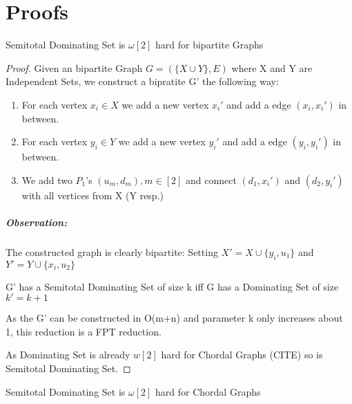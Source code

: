 \chapter{Proofs}

\begin{theorem}
    Semitotal Dominating Set is $\omega[2]$ hard for bipartite Graphs
\end{theorem}

\begin{proof}
    Given an bipartite Graph $G = ( \{X \cup Y\}, E)$ where X and Y are Independent Sets, we construct a bipratite G' the following way:
    \begin{enumerate}
        \item For each vertex $x_i \in X$ we add a new vertex $x_i'$  and add a edge $(x_i, x_i')$ in between.
        \item For each vertex $y_i \in Y$ we add a new vertex $y_i'$ and add a edge $(y_i, y_i')$ in between.
        \item We add two $P_1$'s $(u_m, d_m), m \in [2]$ and connect $(d_1, x_i')$ and $(d_2, y_i')$ with all vertices from X (Y resp.) 
    \end{enumerate}
    \paragraph*{Observation:} The constructed graph is clearly bipartite: Setting $X' = X \cup \{y_i, u_1\}$ and $Y' = Y \cup \{x_i, u_2\}$ 

    \begin{corollary} G' has a Semitotal Dominating Set of size k iff G has a Dominating Set of size $k' = k + 1$
    \end{corollary} 

    As the G' can be constructed in O(m+n) and parameter k only increases about 1, this reduction is a FPT reduction.

    As Dominating Set is already $w[2]$ hard for Chordal Graphs (CITE) so is Semitotal Dominating Set.

\end{proof}

\begin{theorem}
    Semitotal Dominating Set is $\omega[2]$ hard for Chordal Graphs
\end{theorem}
    
